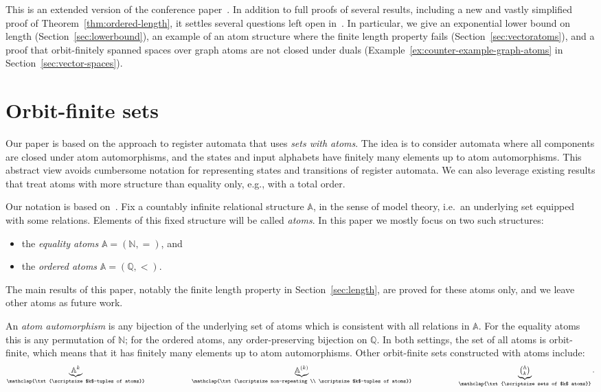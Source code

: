 \documentclass[10pt,a4paper]{amsart}
\numberwithin{equation}{section}
\newcommand{\Nat}{{\mathbb N}}
\newcommand{\Rat}{{\mathbb Q}}
\newcommand{\myunderbrace}[2]{\underbrace{#1}_{\mathclap{\txt{\scriptsize #2}}}}
\newcommand{\atoms}{\mathbb A}
\begin{document}
This is an extended version of the conference paper~\cite{lics21}. In addition to full proofs of several results, including a new and vastly simplified proof of Theorem~\ref{thm:ordered-length}, it settles several questions left open in~\cite{lics21}. In particular, we give an exponential lower bound on length (Section~\ref{sec:lowerbound}), an example of an atom structure where the finite length property fails (Section~\ref{sec:vectoratoms}), and a proof that orbit-finitely spanned spaces over graph atoms are not closed under duals (Example~\ref{ex:counter-example-graph-atoms} in Section~\ref{sec:vector-spaces}).

\section{Orbit-finite sets}
\label{sec:atoms}

Our paper is based on the approach to register automata that uses \emph{sets with atoms}. The idea is to consider automata where all components are closed under atom automorphisms, and the states and input alphabets have finitely many elements up to atom automorphisms. This abstract view avoids cumbersome notation for representing states and transitions of register automata. We can also leverage existing results that treat atoms with more structure than equality only, e.g., with a total order.

 Our notation is based on~\cite{bojanczyk_slightly2018}. 
Fix a countably infinite relational structure $\atoms$, in the sense of model theory, i.e.~an underlying set equipped with some relations. Elements of this fixed structure will be called \emph{atoms}. In this paper we  mostly focus on two such structures:
\begin{itemize}
\item the {\em equality atoms} $\atoms=(\Nat,=)$, and
\item the {\em ordered atoms} $\atoms=(\Rat,<)$.
\end{itemize}
The main results of this paper, notably the finite length property in Section~\ref{sec:length}, are proved  for these atoms only, and we leave other atoms as future work.

An \emph{atom automorphism}  is any bijection of the underlying set of atoms which is consistent with all relations in $\atoms$. For the equality atoms this is any permutation of $\Nat$; for the ordered atoms, any order-preserving bijection on $\Rat$. 
In both settings, the set of all atoms is orbit-finite, which means that it has finitely many elements up to atom automorphisms. Other orbit-finite sets constructed with atoms include:
\begin{align}\label{eq:examples-of-orbit-finite}
\myunderbrace{\atoms^k}{$k$-tuples of atoms} 
\qquad  \qquad \qquad \myunderbrace{\atoms^{(k)}}{non-repeating \\
\scriptsize $k$-tuples of atoms} \qquad \qquad  \qquad
\myunderbrace{\textstyle{\atoms \choose k}}{sets of $k$ atoms}.
\end{align}
\end{document}
